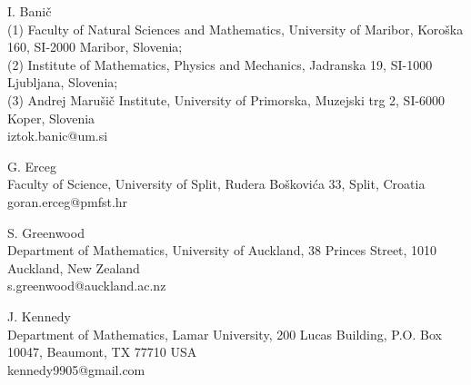 \documentclass[a4paper,12pt]{article} %
\begin{document}
\noindent I. Bani\v c\\
              (1) Faculty of Natural Sciences and Mathematics, University of Maribor, Koro\v{s}ka 160, SI-2000 Maribor,
   Slovenia; \\(2) Institute of Mathematics, Physics and Mechanics, Jadranska 19, SI-1000 Ljubljana, 
   Slovenia; \\(3) Andrej Maru\v si\v c Institute, University of Primorska, Muzejski trg 2, SI-6000 Koper,
   Slovenia\\
             {iztok.banic@um.si}           %
     
				\-
			
	\noindent G.  Erceg\\
             Faculty of Science, University of Split, Rudera Bo\v skovi\' ca 33, Split,  Croatia\\
{{goran.erceg@pmfst.hr}       }    %
                 
%                 
                 \-
			
		\noindent S.  Greenwood\\
            Department of Mathematics, University of Auckland, 38 Princes Street, 1010 Auckland, New Zealand\\
{{s.greenwood@auckland.ac.nz}       }    %
%                 
         
                 	\-
				
  \noindent J.  Kennedy\\
             Department of Mathematics, Lamar University, 200 Lucas Building, P.O. Box 10047, Beaumont, TX 77710 USA\\
{{kennedy9905@gmail.com}       }    %
                 
\end{document}
